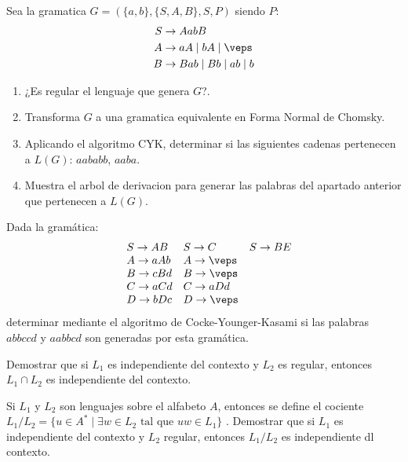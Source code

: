 \begin{ejercicio}\label{ej:1.6.14}
    Sea la gramatica $G = (\{a,b\},\{S,A,B\},S,P)$ siendo $P$:
    \begin{align*}
        S&\rightarrow AabB \\
        A &\rightarrow aA \mid bA \mid \veps \\
        B&\rightarrow Bab \mid Bb \mid ab \mid b
    \end{align*}
    \begin{enumerate}
        \item ¿Es regular el lenguaje que genera $G$?.
        \item Transforma $G$ a una gramatica equivalente en Forma Normal de Chomsky.
        \item Aplicando el algoritmo CYK, determinar si las siguientes cadenas pertenecen a $L(G)$: $aababb$, $aaba$.
        \item Muestra el arbol de derivacion para generar las palabras del apartado anterior que pertenecen a $L(G)$.
    \end{enumerate}
\end{ejercicio}

\begin{ejercicio}\label{ej:1.6.15}
    Dada la gramática:
    \begin{equation*}
        \begin{array}{llll}
            &S\rightarrow AB &S\rightarrow C &S\rightarrow BE \\
            &A\rightarrow aAb &A\rightarrow \veps &\\
            &B\rightarrow cBd &B\rightarrow\veps & \\
            &C\rightarrow aCd &C\rightarrow aDd & \\
            &D\rightarrow bDc &D\rightarrow\veps & 
        \end{array}
    \end{equation*}
    determinar mediante el algoritmo de Cocke-Younger-Kasami si las palabras $abbccd$ y $aabbcd$ son generadas por esta gramática.
\end{ejercicio}

\begin{ejercicio}\label{ej:1.6.16}
    Demostrar que si $L_1$ es independiente del contexto y $L_2$ es regular, entonces $L_1\cap L_2$ es independiente del contexto.
\end{ejercicio}

\begin{ejercicio}\label{ej:1.6.17}
    Si $L_1$ y $L_2$ son lenguajes sobre el alfabeto $A$, entonces se define el cociente $L_1/L_2 = \{u\in A^\ast \mid \exists w\in L_2 \text{\ tal que\ } uw\in L_1\}$ . Demostrar que si $L_1$ es independiente del contexto y $L_2$ regular, entonces $L_1/L_2$ es independiente dl contexto.
\end{ejercicio}

